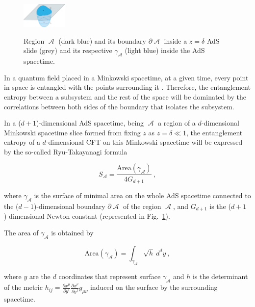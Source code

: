\documentclass[twocolumn]{revtex4}
\providecommand{\eq}[2]{
    \begin{equation}
        #2
    \label{eq:#1}
    \end{equation}
}
\DeclareMathOperator{\calA}{\mathcal{A}}
\begin{document}
\begin{figure}
    \centering
    \includegraphics[width=0.2\textwidth]{../Imatges/Extern/EE_AdS-CFT.png}
\label{fig:EE_AdS-CFT}
\caption{Region $\calA$ (dark blue) and its boundary $\partial \calA$ inside a $z=\delta$ AdS slide (grey) and its respective $\gamma_{\calA}$ (light blue) inside the AdS spacetime.}
\end{figure}

In a quantum field placed in a Minkowski spacetime, at a given time, every point in space is entangled with the points surrounding it \cite{nishioka_entanglement_2018}. Therefore, the entanglement entropy between a subsystem and the rest of the space will be dominated by the correlations between both sides of the boundary that isolates the subsystem.



In a ($d+1$)-dimensional AdS spacetime, being $\calA$ a region of a $d$-dimensional Minkowski spacetime slice formed from fixing $z$ as $z=\delta \ll 1$, the entanglement entropy of a $d$-dimensional CFT on this Minkowski spacetime will be expressed by the so-called Ryu-Takayanagi formula
\eq{EE_RT}{
    S_{\calA} = \frac{ \text{Area}(\gamma_{\calA}) }{ 4 G_{d+1} } \ ,
}
\cite{ryu_holographic_2008} where $\gamma_{\calA}$ is the surface of minimal area on the whole AdS spacetime connected to the ($d-1$)-dimensional boundary $\partial \calA$ of the region $\calA$, and $G_{d+1}$ is the ($d+1$)-dimensional Newton constant (represented in Fig.~\ref{fig:EE_AdS-CFT}).

The area of $\gamma_{\calA}$ is obtained by
\eq{EE_RT-area}{
    \text{Area}(\gamma_{\calA}) = \int_{\gamma_{\calA}} \sqrt{h} \ d^{d}y \ ,
}
where $y$ are the $d$ coordinates that represent surface $\gamma_{\calA}$ and $h$ is the determinant of the metric $h_{ij} = \frac{\partial x^\mu}{\partial y^i} \frac{\partial x^\nu}{\partial y^j} g_{\mu\nu}$ induced on the surface by the surrounding spacetime.
\end{document}
